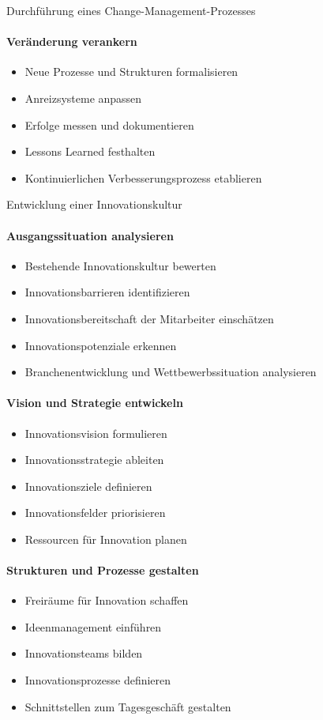 \begin{KR}{Durchführung eines Change-Management-Prozesses}
\paragraph{Veränderung verankern}
\begin{itemize}
    \item Neue Prozesse und Strukturen formalisieren
    \item Anreizsysteme anpassen
    \item Erfolge messen und dokumentieren
    \item Lessons Learned festhalten
    \item Kontinuierlichen Verbesserungsprozess etablieren
\end{itemize}
\end{KR}

\begin{KR}{Entwicklung einer Innovationskultur}\\
\paragraph{Ausgangssituation analysieren}
\begin{itemize}
    \item Bestehende Innovationskultur bewerten
    \item Innovationsbarrieren identifizieren
    \item Innovationsbereitschaft der Mitarbeiter einschätzen
    \item Innovationspotenziale erkennen
    \item Branchenentwicklung und Wettbewerbssituation analysieren
\end{itemize}

\paragraph{Vision und Strategie entwickeln}
\begin{itemize}
    \item Innovationsvision formulieren
    \item Innovationsstrategie ableiten
    \item Innovationsziele definieren
    \item Innovationsfelder priorisieren
    \item Ressourcen für Innovation planen
\end{itemize}

\paragraph{Strukturen und Prozesse gestalten}
\begin{itemize}
    \item Freiräume für Innovation schaffen
    \item Ideenmanagement einführen
    \item Innovationsteams bilden
    \item Innovationsprozesse definieren
    \item Schnittstellen zum Tagesgeschäft gestalten
\end{itemize}


\end{KR}
